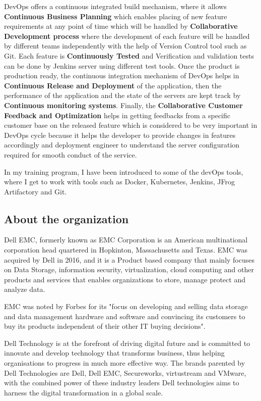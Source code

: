 \documentclass[12pt]{article}
\begin{document}
DevOps offers a continuous integrated build mechanism, where it allows \textbf{Continuous Business Planning} which enables placing of new feature requirements at any point of time which will be handled by \textbf{Collaborative Development process} where the development of each feature will be handled by different teams independently with the help of Version Control tool such as Git. Each feature is \textbf{Continuously Tested} and Verification and validation tests can be done by Jenkins server using different test tools. Once the product is production ready, the continuous integration mechanism of DevOps helps in \textbf{Continuous Release and Deployment} of the application, then the performance of the application and the state of the servers are kept track by \textbf{Continuous monitoring systems}. Finally, the \textbf{Collaborative Customer Feedback and Optimization} helps in getting feedbacks from a specific customer base on the released feature which is considered to be very important in DevOps cycle because it helps the developer to provide changes in features accordingly and deployment engineer to understand the server configuration required for smooth conduct of the service. 

In my training program, I have been introduced to some of the devOps tools, where I get to work with tools such as Docker, Kubernetes, Jenkins, JFrog Artifactory and Git.
	
	\subsection{About the organization}
	
Dell EMC, formerly known as EMC Corporation is an American multinational corporation head quartered in Hopkinton, Massachusetts and Texas. EMC was acquired by Dell in 2016, and it is a Product based company that mainly focuses on Data Storage, information security, virtualization, cloud computing and other products and services that enables organizations to store, manage protect and analyze data. 

EMC was noted by Forbes for its "focus on developing and selling data storage and data management hardware and software and convincing its customers to buy its products independent of their other IT buying decisions".

Dell Technology is at the forefront of driving digital future and is committed to innovate and develop technology that transforms business, thus helping organisations to progress in much more effective way. The brands parented by Dell Technologies are Dell, Dell EMC, Secureworks, virtustream and VMware, with the combined power of these industry leaders Dell technologies aims to harness the digital transformation in a global scale.
\end{document}
